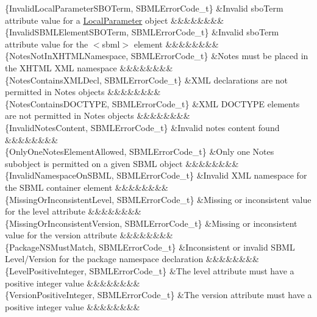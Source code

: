 \begin{DoxyParagraph}{}
\begin{longtabu}
\{Invalid\+Local\+Parameter\+S\+B\+O\+Term, S\+B\+M\+L\+Error\+Code\+\_\+t\} &Invalid \textquotesingle{}sbo\+Term\textquotesingle{} attribute value for a \hyperlink{class_local_parameter}{Local\+Parameter} object &&&&&&&&\\
\{Invalid\+S\+B\+M\+L\+Element\+S\+B\+O\+Term, S\+B\+M\+L\+Error\+Code\+\_\+t\} &Invalid \textquotesingle{}sbo\+Term\textquotesingle{} attribute value for the {\ttfamily $<$sbml$>$} element &&&&&&&&\\
\{Notes\+Not\+In\+X\+H\+T\+M\+L\+Namespace, S\+B\+M\+L\+Error\+Code\+\_\+t\} &Notes must be placed in the X\+H\+T\+ML X\+ML namespace &&&&&&&&\\
\{Notes\+Contains\+X\+M\+L\+Decl, S\+B\+M\+L\+Error\+Code\+\_\+t\} &X\+ML declarations are not permitted in Notes objects &&&&&&&&\\
\{Notes\+Contains\+D\+O\+C\+T\+Y\+PE, S\+B\+M\+L\+Error\+Code\+\_\+t\} &X\+ML D\+O\+C\+T\+Y\+PE elements are not permitted in Notes objects &&&&&&&&\\
\{Invalid\+Notes\+Content, S\+B\+M\+L\+Error\+Code\+\_\+t\} &Invalid notes content found &&&&&&&&\\
\{Only\+One\+Notes\+Element\+Allowed, S\+B\+M\+L\+Error\+Code\+\_\+t\} &Only one Notes subobject is permitted on a given S\+B\+ML object &&&&&&&&\\
\{Invalid\+Namespace\+On\+S\+B\+ML, S\+B\+M\+L\+Error\+Code\+\_\+t\} &Invalid X\+ML namespace for the S\+B\+ML container element &&&&&&&&\\
\{Missing\+Or\+Inconsistent\+Level, S\+B\+M\+L\+Error\+Code\+\_\+t\} &Missing or inconsistent value for the \textquotesingle{}level\textquotesingle{} attribute &&&&&&&&\\
\{Missing\+Or\+Inconsistent\+Version, S\+B\+M\+L\+Error\+Code\+\_\+t\} &Missing or inconsistent value for the \textquotesingle{}version\textquotesingle{} attribute &&&&&&&&\\
\{Package\+N\+S\+Must\+Match, S\+B\+M\+L\+Error\+Code\+\_\+t\} &Inconsistent or invalid S\+B\+ML Level/\+Version for the package namespace declaration &&&&&&&&\\
\{Level\+Positive\+Integer, S\+B\+M\+L\+Error\+Code\+\_\+t\} &The \textquotesingle{}level\textquotesingle{} attribute must have a positive integer value &&&&&&&&\\
\{Version\+Positive\+Integer, S\+B\+M\+L\+Error\+Code\+\_\+t\} &The \textquotesingle{}version\textquotesingle{} attribute must have a positive integer value &&&&&&&&\\

\end{longtabu}
\end{DoxyParagraph}
